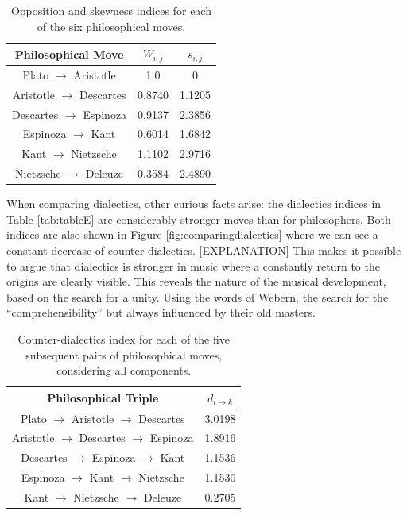 \documentclass[
 aip,
 jmp,
 amsmath,amssymb,
 reprint,
]{revtex4-1}
\begin{document}
\begin{table}%
\caption{\label{tab:tablephiOI}Opposition and skewness indices for each
of the six philosophical moves.}

\begin{tabular}{|c||c|c|}
\hline
Philosophical Move & $W_{i,j}$ & $s_{i,j}$ \\
\hline \hline
Plato $\rightarrow$ Aristotle     & 1.0    & 0 \\
Aristotle $\rightarrow$ Descartes & 0.8740 & 1.1205 \\
Descartes $\rightarrow$ Espinoza  & 0.9137 & 2.3856 \\
Espinoza $\rightarrow$ Kant       & 0.6014 & 1.6842 \\
Kant $\rightarrow$ Nietzsche      & 1.1102 & 2.9716 \\
Nietzsche $\rightarrow$ Deleuze   & 0.3584 & 2.4890 \\
\hline
\end{tabular}
\end{table}

When comparing dialectics, other curious facts arise: the dialectics
indices in Table \ref{tab:tableE} are considerably stronger moves than for
philosophers. Both indices are also shown in Figure
\ref{fig:comparingdialectics} where we can see a constant decrease
of counter-dialectics. [EXPLANATION] This makes it possible to argue
that dialectics is stronger in music where a
constantly return to the origins are clearly visible. This reveals the nature of the
musical development, based on the search for a unity. Using the words
of Webern, the search for the ``comprehensibility'' but always
influenced by their old masters.

\begin{table}%
\caption{\label{tab:tablephiE} Counter-dialectics index for each
of the five subsequent pairs of philosophical moves, considering all components.}

\begin{tabular}{|c||c|}
\hline
Philosophical Triple & $d_{i \rightarrow k}$ \\
\hline \hline
Plato $\rightarrow$ Aristotle $\rightarrow$ Descartes    & 3.0198 \\
Aristotle $\rightarrow$ Descartes $\rightarrow$ Espinoza & 1.8916 \\
Descartes $\rightarrow$ Espinoza $\rightarrow$ Kant      & 1.1536 \\
Espinoza $\rightarrow$ Kant $\rightarrow$ Nietzsche      & 1.1530 \\
Kant $\rightarrow$ Nietzsche $\rightarrow$ Deleuze       & 0.2705 \\
\hline
\end{tabular}
\end{table}
\end{document}
